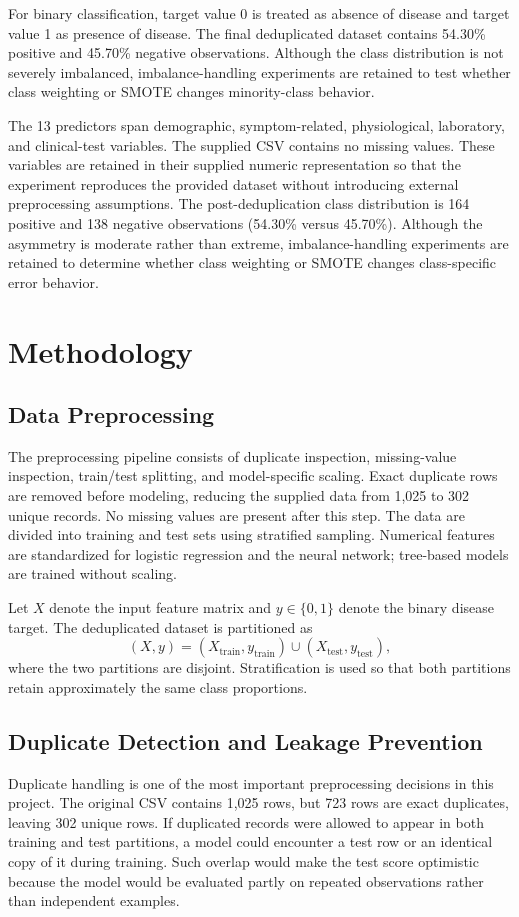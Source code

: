\documentclass[10pt]{article}
\begin{document}
For binary classification, target value 0 is treated as absence of disease and target value 1 as presence of disease. The final deduplicated dataset contains 54.30\% positive and 45.70\% negative observations. Although the class distribution is not severely imbalanced, imbalance-handling experiments are retained to test whether class weighting or SMOTE changes minority-class behavior.

The 13 predictors span demographic, symptom-related, physiological, laboratory, and clinical-test variables. The supplied CSV contains no missing values. These variables are retained in their supplied numeric representation so that the experiment reproduces the provided dataset without introducing external preprocessing assumptions. The post-deduplication class distribution is 164 positive and 138 negative observations (54.30\% versus 45.70\%). Although the asymmetry is moderate rather than extreme, imbalance-handling experiments are retained to determine whether class weighting or SMOTE changes class-specific error behavior.

\section{Methodology}

\subsection{Data Preprocessing}
The preprocessing pipeline consists of duplicate inspection, missing-value inspection, train/test splitting, and model-specific scaling. Exact duplicate rows are removed before modeling, reducing the supplied data from 1,025 to 302 unique records. No missing values are present after this step. The data are divided into training and test sets using stratified sampling. Numerical features are standardized for logistic regression and the neural network; tree-based models are trained without scaling.

Let $X$ denote the input feature matrix and $y\in\{0,1\}$ denote the binary disease target. The deduplicated dataset is partitioned as
\begin{equation}
(X,y) = (X_{\mathrm{train}},y_{\mathrm{train}}) \cup (X_{\mathrm{test}},y_{\mathrm{test}}),
\end{equation}
where the two partitions are disjoint. Stratification is used so that both partitions retain approximately the same class proportions.


\subsection{Duplicate Detection and Leakage Prevention}
Duplicate handling is one of the most important preprocessing decisions in this project. The original CSV contains 1,025 rows, but 723 rows are exact duplicates, leaving 302 unique rows. If duplicated records were allowed to appear in both training and test partitions, a model could encounter a test row or an identical copy of it during training. Such overlap would make the test score optimistic because the model would be evaluated partly on repeated observations rather than independent examples.
\end{document}
